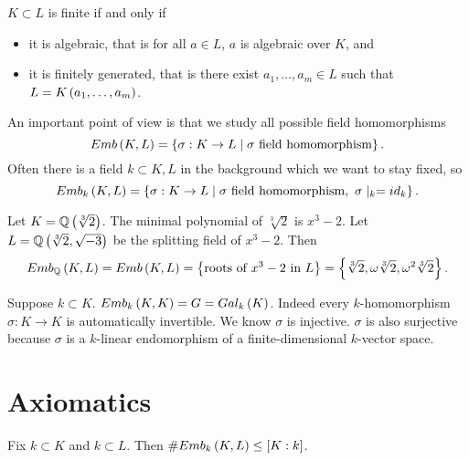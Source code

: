 \begin{remark*}
$ K \subset L $ is finite if and only if
\begin{itemize}
\item it is algebraic, that is for all $ a \in L $, $ a $ is algebraic over $ K $, and
\item it is finitely generated, that is there exist $ a_1, \dots, a_m \in L $ such that $ L = K\left( a_1, \dots, a_m \right) $.
\end{itemize}
\end{remark*}

An important point of view is that we study all possible field homomorphisms
$$ Emb\left( K, L \right) = \left\{ \sigma : K \to L \mid \sigma \ \text{field homomorphism} \right\}. $$
Often there is a field $ k \subset K, L $ in the background which we want to stay fixed, so
$$ Emb_k\left( K, L \right) = \left\{ \sigma : K \to L \mid \sigma \ \text{field homomorphism}, \ \sigma \mid_k = id_k \right\}. $$

\begin{example*}
Let $ K = \mathbb{Q}\left( \sqrt[3]{2} \right) $. The minimal polynomial of $ \sqrt[3]{2} $ is $ x^3 - 2 $. Let $ L = \mathbb{Q}\left( \sqrt[3]{2}, \sqrt{-3} \right) $ be the splitting field of $ x^3 - 2 $. Then
$$ Emb_{\mathbb{Q}}\left( K, L \right) = Emb\left( K, L \right) = \left\{ \text{roots of} \ x^3 - 2 \ \text{in} \ L \right\} = \left\{ \sqrt[3]{2}, \omega\sqrt[3]{2}, \omega^2\sqrt[3]{2} \right\}. $$
\end{example*}

\begin{remark*}
Suppose $ k \subset K $. $ Emb_k\left( K, K \right) = G = Gal_k\left( K \right) $. Indeed every $ k $-homomorphism $ \sigma : K \to K $ is automatically invertible. We know $ \sigma $ is injective. $ \sigma $ is also surjective because $ \sigma $ is a $ k $-linear endomorphism of a finite-dimensional $ k $-vector space.
\end{remark*}

\section{Axiomatics}

\begin{proposition}
\label{prop:1}
Fix $ k \subset K $ and $ k \subset L $. Then $ \#Emb_k\left( K, L \right) \le \left[ K : k \right] $.
\end{proposition}

